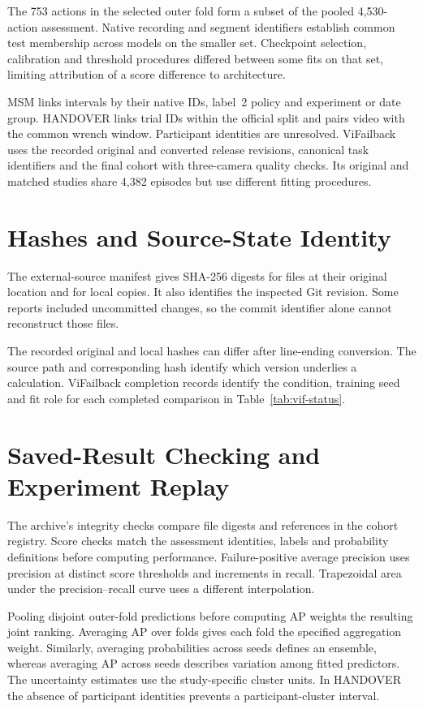 The 753 actions in the selected outer fold form a subset of the pooled 4,530-action assessment. Native recording and segment identifiers establish common test membership across models on the smaller set. Checkpoint selection, calibration and threshold procedures differed between some fits on that set, limiting attribution of a score difference to architecture.

MSM links intervals by their native IDs, label~2 policy and experiment or date group. HANDOVER links trial IDs within the official split and pairs video with the common wrench window. Participant identities are unresolved. ViFailback uses the recorded original and converted release revisions, canonical task identifiers and the final cohort with three-camera quality checks. Its original and matched studies share 4,382 episodes but use different fitting procedures.

\section{Hashes and Source-State Identity}
The external-source manifest gives SHA-256 digests for files at their original location and for local copies. It also identifies the inspected Git revision. Some reports included uncommitted changes, so the commit identifier alone cannot reconstruct those files.

The recorded original and local hashes can differ after line-ending conversion. The source path and corresponding hash identify which version underlies a calculation. ViFailback completion records identify the condition, training seed and fit role for each completed comparison in Table~\ref{tab:vif-status}.

\section{Saved-Result Checking and Experiment Replay}
The archive's integrity checks compare file digests and references in the cohort registry. Score checks match the assessment identities, labels and probability definitions before computing performance. Failure-positive average precision uses precision at distinct score thresholds and increments in recall. Trapezoidal area under the precision--recall curve uses a different interpolation.

Pooling disjoint outer-fold predictions before computing AP weights the resulting joint ranking. Averaging AP over folds gives each fold the specified aggregation weight. Similarly, averaging probabilities across seeds defines an ensemble, whereas averaging AP across seeds describes variation among fitted predictors. The uncertainty estimates use the study-specific cluster units. In HANDOVER the absence of participant identities prevents a participant-cluster interval.

